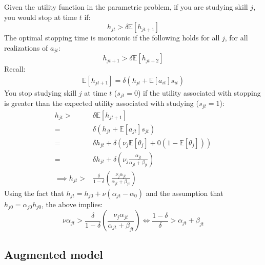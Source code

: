 \documentclass[10 pt]{article}
\newcommand{\sbr}[1]{\left[ #1 \right]}
\newcommand{\pr}[1]{\left( #1 \right)}
\begin{document}
{\begin{blist}
Given the utility function in the parametric problem, if you are studying skill $j$, you would stop at time $t$ if:
\begin{equation}
h_{jt} > \delta \mathbb{E} \sbr{h_{jt+1}}
\end{equation}
The optimal stopping time is monotonic if the following holds for all $j$, for all realizations of $a_{jt}$:
\begin{equation}
h_{jt+1} > \delta \mathbb{E} \sbr{h_{jt+2}}
\end{equation}
Recall:
\begin{align*}
\mathbb{E} \sbr{h_{jt+1}} = \delta (h_{jt} + \mathbb{E} \sbr{a_{it}} s_{it})
\end{align*}
You stop studying skill $j$ at time $t$ ($s_{jt}=0$) if the utility associated with stopping is greater than the expected utility associated with studying ($s_{jt}=1$):
\begin{align*}
h_{jt} >& \delta \mathbb{E} \sbr{h_{jt+1}} \\
=& \delta (h_{jt} + \mathbb{E} \sbr{a_{jt}} s_{jt}) \\
=& \delta h_{jt} + \delta \pr{\nu_j \mathbb{E} \sbr{\theta_j} + 0 (1 - \mathbb{E} \sbr{\theta_j})} \\
=& \delta h_{jt} + \delta \pr{\nu_j \frac{\alpha_{jt}}{\alpha_{jt} + \beta_{jt}}} \\
\implies h_{jt} >& \frac{\delta}{1 - \delta} \pr{\frac{\nu_j \alpha_{jt}}{\alpha_{jt} + \beta_{jt}}}
\end{align*}
Using the fact that $h_{jt} = h_{j0} + \nu (\alpha_{jt} - \alpha_0)$ and the assumption that $h_{j0} = \alpha_{j0} h_{j0}$, the above implies:
\begin{equation*}
\nu \alpha_{jt} > \frac{\delta}{1 - \delta} \pr{\frac{\nu_j \alpha_{jt}}{\alpha_{jt} + \beta_{jt}}} \iff \frac{1-\delta}{\delta} > \alpha_{jt} + \beta_{jt}
\end{equation*} 
\end{blist}
} %


\subsection{Augmented model}
\end{document}
